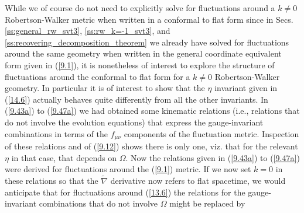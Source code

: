While we of course do not need to explicitly solve for fluctuations around a $k\neq 0$ Robertson-Walker metric when written in a conformal to flat form since in Secs. \ref{ss:general_rw_svt3}, \ref{ss:rw_k=-1_svt3}, and \ref{ss:recovering_decomposition_theorem} we already have solved for fluctuations around the same geometry when written in the general coordinate equivalent form given in (\ref{9.1}), it is nonetheless of interest to explore the structure of fluctuations around the conformal to flat form for a $k\neq 0$ Robertson-Walker geometry. In particular it is of interest to show that the $\eta$ invariant given in (\ref{14.6}) actually behaves quite differently from all the other invariants.   In (\ref{9.43a}) to (\ref{9.47a}) we had obtained some kinematic relations (i.e., relations that do not involve the evolution equations) that express the gauge-invariant combinations in terms of the  $f_{\mu\nu}$ components of the fluctuation metric. Inspection of these relations and of (\ref{9.12}) shows there is  only one, viz. that for the relevant $\eta$ in that case, that depends on $\Omega$. Now the relations given  in (\ref{9.43a}) to (\ref{9.47a}) were derived for fluctuations around the (\ref{9.1}) metric. If we now set $k=0$ in these relations so that the $\tilde{\nabla}$ derivative now refers to flat spacetime, we would anticipate that for fluctuations around (\ref{13.6}) the relations for the gauge-invariant combinations that do not involve $\Omega$ might be replaced by 

